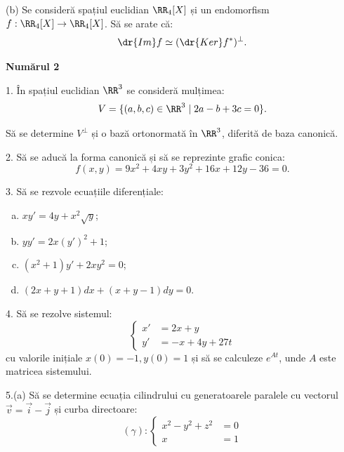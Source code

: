 
(b) Se consideră spațiul euclidian $ \RR_4[X] $ și un endomorfism
$ f : \RR_4[X] \to \RR_4[X] $. Să se arate că:
\[
  \dr{Im}f \simeq (\dr{Ker}f^\ast)^\perp.
\]



\textbf{Numărul 2}

1. În spațiul euclidian $ \RR^3 $ se consideră mulțimea:
\[
  V = \{(a, b, c) \in \RR^3 \mid 2a - b + 3c = 0 \}.
\]

Să se determine $ V^\perp $ și o bază ortonormată în $ \RR^3 $, diferită
de baza canonică.

\vspace{1cm}


2. Să se aducă la forma canonică și să se reprezinte grafic conica:
\[
  f(x, y) = 9x^2 + 4xy + 3y^2 + 16x + 12y - 36 = 0.
\]

\vspace{1cm}

3. Să se rezvole ecuațiile diferențiale:
\begin{enumerate}[(a)]
  \item $ xy' = 4y + x^2 \sqrt{y} $;
  \item $ yy' = 2x(y')^2 + 1 $;
  \item $ (x^2 + 1)y' + 2xy^2 = 0 $;
  \item $ (2x + y + 1)dx + (x + y - 1) dy = 0 $.
\end{enumerate}


\vspace{1cm}

4. Să se rezolve sistemul:
\[
  \begin{cases}
    x' &= 2x + y \\
    y' &= -x + 4y + 27t
  \end{cases}
\]
cu valorile inițiale $ x(0) = -1, y(0) = 1 $ și să se calculeze
$ e^{At} $, unde $ A $ este matricea sistemului.

\vspace{1cm}

5.(a) Să se determine ecuația cilindrului cu generatoarele paralele
cu vectorul $ \vec{v} = \vec{i} - \vec{j} $ și curba directoare:
\[
  (\gamma): %
  \begin{cases}
    x^2 - y^2 + z^2 &= 0 \\
    x &= 1
  \end{cases}
\]

